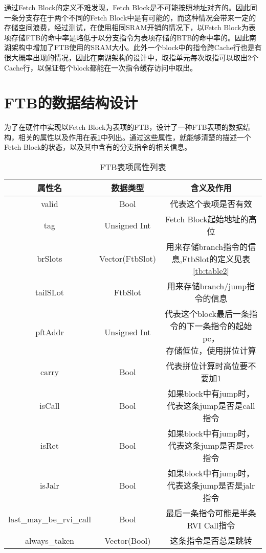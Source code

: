 通过Fetch Block的定义不难发现，Fetch Block是不可能按照地址对齐的。因此同一条分支存在于两个不同的Fetch Block中是有可能的，而这种情况会带来一定的存储空间浪费，经过测试，在使用相同SRAM开销的情况下，以Fetch Block为表项存储FTB的命中率是略低于以分支指令为表项存储的BTB的命中率的。因此南湖架构中增加了FTB使用的SRAM大小。此外一个block中的指令跨Cache行也是有很大概率出现的情况，因此在南湖架构的设计中，取指单元每次取指可以取出2个Cache行，以保证每个block都能在一次指令缓存访问中取出。

\section{FTB的数据结构设计}


为了在硬件中实现以Fetch Block为表项的FTB，设计了一种FTB表项的数据结构，相关的属性以及作用在表\ref{tb:table1}中列出。通过这些属性，就能够清楚的描述一个Fetch Block的状态，以及其中含有的分支指令的相关信息。

\begin{table}[]
	\caption{FTB表项属性列表}
	\label{tb:table1}
	\centering
	\begin{tabular}{|c|c|c|}
		\hline
		属性名   & 数据类型   & 含义及作用   \\ \hline
		valid & Bool & 代表这个表项是否有效 \\ \hline
		tag & Unsigned Int & Fetch Block起始地址的高位 \\ \hline
		brSlots & Vector(FtbSlot) & 用来存储branch指令的信息,FtbSlot的定义见表\ref{tb:table2} \\ \hline
		tailSLot & FtbSlot & 用来存储branch/jump指令的信息 \\ \hline
		pftAddr & Unsigned Int & \tabincell{c}{代表这个block最后一条指令的下一条指令的起始pc， \\ 存储低位，使用拼位计算} \\ \hline
		carry & Bool & 代表拼位计算时高位要不要加1 \\ \hline
		isCall & Bool & 如果block中有jump时，代表这条jump是否是call指令 \\ \hline
		isRet & Bool & 如果block中有jump时，代表这条jump是否是ret指令 \\ \hline
		isJalr & Bool & 如果block中有jump时，代表这条jump是否是jalr指令 \\ \hline
		last\_may\_be\_rvi\_call & Bool & 最后一条指令可能是半条RVI Call指令 \\ \hline
		always\_taken & Vector(Bool) & 这条指令是否总是跳转 \\ \hline
	\end{tabular}
\end{table}

